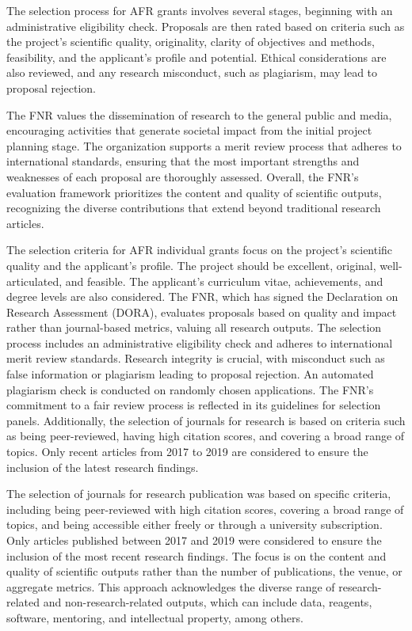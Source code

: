 \documentclass{article}
\begin{document}
The selection process for AFR grants involves several stages, beginning with an administrative eligibility check. Proposals are then rated based on criteria such as the project's scientific quality, originality, clarity of objectives and methods, feasibility, and the applicant's profile and potential. Ethical considerations are also reviewed, and any research misconduct, such as plagiarism, may lead to proposal rejection.

The FNR values the dissemination of research to the general public and media, encouraging activities that generate societal impact from the initial project planning stage. The organization supports a merit review process that adheres to international standards, ensuring that the most important strengths and weaknesses of each proposal are thoroughly assessed. Overall, the FNR's evaluation framework prioritizes the content and quality of scientific outputs, recognizing the diverse contributions that extend beyond traditional research articles.

The selection criteria for AFR individual grants focus on the project's scientific quality and the applicant's profile. The project should be excellent, original, well-articulated, and feasible. The applicant's curriculum vitae, achievements, and degree levels are also considered. The FNR, which has signed the Declaration on Research Assessment (DORA), evaluates proposals based on quality and impact rather than journal-based metrics, valuing all research outputs. The selection process includes an administrative eligibility check and adheres to international merit review standards. Research integrity is crucial, with misconduct such as false information or plagiarism leading to proposal rejection. An automated plagiarism check is conducted on randomly chosen applications. The FNR's commitment to a fair review process is reflected in its guidelines for selection panels. Additionally, the selection of journals for research is based on criteria such as being peer-reviewed, having high citation scores, and covering a broad range of topics. Only recent articles from 2017 to 2019 are considered to ensure the inclusion of the latest research findings.

The selection of journals for research publication was based on specific criteria, including being peer-reviewed with high citation scores, covering a broad range of topics, and being accessible either freely or through a university subscription. Only articles published between 2017 and 2019 were considered to ensure the inclusion of the most recent research findings. The focus is on the content and quality of scientific outputs rather than the number of publications, the venue, or aggregate metrics. This approach acknowledges the diverse range of research-related and non-research-related outputs, which can include data, reagents, software, mentoring, and intellectual property, among others.
\end{document}
